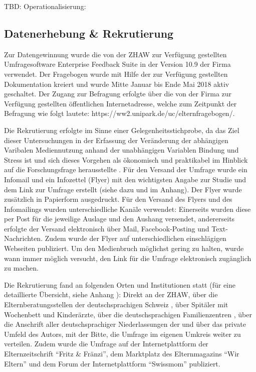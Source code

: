 TBD: Operationalisierung:


\subsection{Datenerhebung \& Rekrutierung}
Zur Datengewinnung wurde die von der ZHAW zur Verfügung gestellten Umfragesoftware Enterprise Feedback Suite in der Version 10.9 der Firma  verwendet. Der Fragebogen wurde mit Hilfe der zur Verfügung gestellten Dokumentation kreiert \cite{EFS2016} und wurde Mitte Januar bis Ende Mai 2018 aktiv geschaltet.  Der Zugang zur Befragung erfolgte über die von der Firma  zur Verfügung gestellten öffentlichen Internetadresse, welche zum Zeitpunkt der Befragung wie folgt lautete: https://ww2.unipark.de/uc/elternfragebogen/.

Die Rekrutierung erfolgte im Sinne einer Gelegenheitsstichprobe, da das Ziel dieser Untersuchungen in der Erfassung der Veränderung der abhängigen Varibalen Mediennutzung anhand der unabhängigen Variablen Bindung und Stress ist und sich dieses Vorgehen als ökonomisch und praktikabel im Hinblick auf die Forschungsfrage herausstellte \cite{TUDresden2015}. Für den Versand der Umfrage wurde ein Infomail und ein Infozettel (Flyer) mit den wichtigsten Angabe zur Studie und dem Link zur Umfrage erstellt (siehe dazu  und  im Anhang). Der Flyer wurde zusätzlich in Papierform ausgedruckt. Für den Versand des Flyers und des Infomailings wurden unterschiedliche Kanäle verwendet: Einerseits wurden diese per Post für die jeweilige Auslage und den Aushang versendet, andererseits erfolgte der Versand elektronisch über Mail, Facebook-Posting und Text-Nachrichten. Zudem wurde der Flyer auf unterschiedlichen einschlägigen Webseiten publiziert. Um den Medienbruch möglichst gering zu halten, wurde wann immer möglich versucht, den Link für die Umfrage elektronisch zugänglich zu machen. 

Die Rekrutierung fand an folgenden Orten und Institutionen statt (für eine detaillierte Übersicht, siehe Anhang ): Direkt an der ZHAW, über die Elternberatungsstellen der deutschsprachigen Schweiz \cite{Sfmvb2018}, über Spitäler mit Wochenbett und Kinderärzte, über die deutschsprachigen Familienzentren \cite{NetzwerkBildung2018}, über die Anschrift aller deutschsprachiger Niederlassungen der  und über das private Umfeld des Autors, mit der Bitte, die Umfrage im eigenen Umkreis weiter zu verteilen. Zudem wurde die Umfrage auf der Internetplattform der Elternzeitschrift \enquote{Fritz \&  Fränzi}, dem Marktplatz des Elternmagazins \enquote{Wir Eltern} und dem Forum der Internetplattform \enquote{Swissmom} publiziert.

